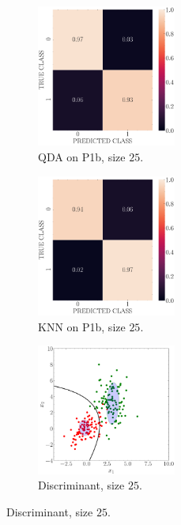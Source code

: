 \documentclass[11pt, a4 paper]{article}
\begin{document}
\begin{figure}[!htbp]
\quad    
    \begin{subfigure}[!htbp]{0.24\textwidth}
       \centering
       \includegraphics[width=1.8in]{../results/ex1/conf_mtx_QD_ML_dataset_P1b_size_25.pdf}
       \caption{QDA on P1b, size $25$.}
       \label{fig:KNN_P1b_25}
    \end{subfigure}
\quad    
    \begin{subfigure}[!htbp]{0.24\textwidth}
       \centering
       \includegraphics[width=1.8in]{../results/ex1/conf_mtx_KNN_dataset_P1b_size_25.pdf}
       \caption{KNN on P1b, size $25$.}
       \label{fig:KNN_P1b_25}
    \end{subfigure}
\quad
    \begin{subfigure}[!htbp]{0.24\textwidth}
       \centering
       \includegraphics[width=1.8in]{../results/ex1/samples_QD_ML_dataset_P1b_size_25.pdf}
       \caption{Discriminant, size $25$.}
       \label{fig:KNN_P1b_25}
    \end{subfigure}
    

\end{figure}
\end{document}
